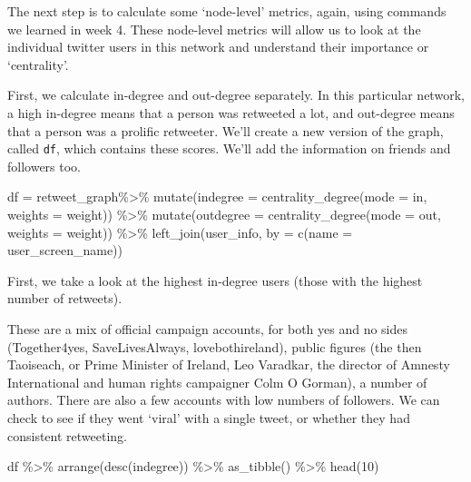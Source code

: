 \documentclass[
]{book}
\newenvironment{Shaded}{\begin{snugshade}}{\end{snugshade}}
\newcommand{\AttributeTok}[1]{\textcolor[rgb]{0.77,0.63,0.00}{#1}}
\newcommand{\DecValTok}[1]{\textcolor[rgb]{0.00,0.00,0.81}{#1}}
\newcommand{\FunctionTok}[1]{\textcolor[rgb]{0.00,0.00,0.00}{#1}}
\newcommand{\NormalTok}[1]{#1}
\newcommand{\OtherTok}[1]{\textcolor[rgb]{0.56,0.35,0.01}{#1}}
\newcommand{\SpecialCharTok}[1]{\textcolor[rgb]{0.00,0.00,0.00}{#1}}
\newcommand{\StringTok}[1]{\textcolor[rgb]{0.31,0.60,0.02}{#1}}
\begin{document}
The next step is to calculate some `node-level' metrics, again, using commands we learned in week 4. These node-level metrics will allow us to look at the individual twitter users in this network and understand their importance or `centrality'.

First, we calculate in-degree and out-degree separately. In this particular network, a high in-degree means that a person was retweeted a lot, and out-degree means that a person was a prolific retweeter. We'll create a new version of the graph, called \texttt{df}, which contains these scores. We'll add the information on friends and followers too.

\begin{Shaded}
\begin{Highlighting}[]
\NormalTok{df }\OtherTok{=}\NormalTok{ retweet\_graph}\SpecialCharTok{\%\textgreater{}\%} 
  \FunctionTok{mutate}\NormalTok{(}\AttributeTok{indegree =} \FunctionTok{centrality\_degree}\NormalTok{(}\AttributeTok{mode =} \StringTok{\textquotesingle{}in\textquotesingle{}}\NormalTok{, }\AttributeTok{weights =}\NormalTok{ weight)) }\SpecialCharTok{\%\textgreater{}\%} 
  \FunctionTok{mutate}\NormalTok{(}\AttributeTok{outdegree =} \FunctionTok{centrality\_degree}\NormalTok{(}\AttributeTok{mode =} \StringTok{\textquotesingle{}out\textquotesingle{}}\NormalTok{, }\AttributeTok{weights =}\NormalTok{ weight)) }\SpecialCharTok{\%\textgreater{}\%}
  \FunctionTok{left\_join}\NormalTok{(user\_info, }\AttributeTok{by =} \FunctionTok{c}\NormalTok{(}\StringTok{\textquotesingle{}name\textquotesingle{}} \OtherTok{=} \StringTok{\textquotesingle{}user\_screen\_name\textquotesingle{}}\NormalTok{))}
\end{Highlighting}
\end{Shaded}

First, we take a look at the highest in-degree users (those with the highest number of retweets).

These are a mix of official campaign accounts, for both yes and no sides (Together4yes, SaveLivesAlways, lovebothireland), public figures (the then Taoiseach, or Prime Minister of Ireland, Leo Varadkar, the director of Amnesty International and human rights campaigner Colm O Gorman), a number of authors. There are also a few accounts with low numbers of followers. We can check to see if they went `viral' with a single tweet, or whether they had consistent retweeting.

\begin{Shaded}
\begin{Highlighting}[]
\NormalTok{df }\SpecialCharTok{\%\textgreater{}\%} \FunctionTok{arrange}\NormalTok{(}\FunctionTok{desc}\NormalTok{(indegree)) }\SpecialCharTok{\%\textgreater{}\%} \FunctionTok{as\_tibble}\NormalTok{() }\SpecialCharTok{\%\textgreater{}\%} \FunctionTok{head}\NormalTok{(}\DecValTok{10}\NormalTok{)}
\end{Highlighting}
\end{Shaded}
\end{document}
